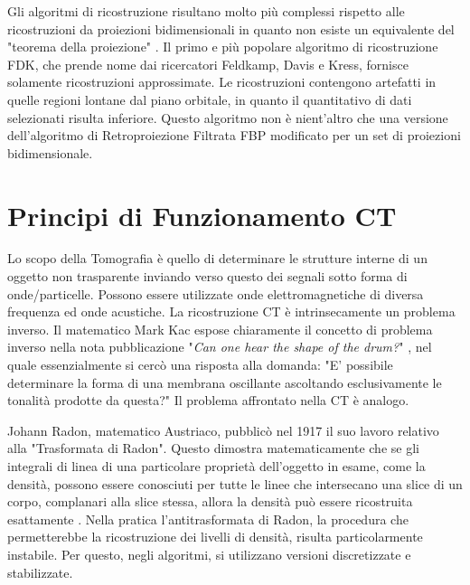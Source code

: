 \documentclass[a4paper,12pt, doubleside]{report}
\begin{document}
                \par
                    Gli algoritmi di ricostruzione risultano molto più complessi rispetto alle ricostruzioni da proiezioni bidimensionali in quanto non esiste un equivalente del "teorema della proiezione" \cite{zeng}.
                    Il primo e più popolare algoritmo di ricostruzione FDK, che prende nome dai ricercatori Feldkamp, Davis e Kress, fornisce solamente ricostruzioni approssimate. Le ricostruzioni contengono artefatti in quelle regioni lontane dal piano orbitale, in quanto il quantitativo di dati selezionati risulta inferiore.
                    Questo algoritmo non è nient'altro che una versione dell'algoritmo di Retroproiezione Filtrata FBP modificato per un set di proiezioni bidimensionale.   
                                            
        \section{Principi di Funzionamento CT}
            \par
                Lo scopo della Tomografia è quello di determinare le strutture interne di un oggetto non trasparente inviando verso questo dei segnali sotto forma di onde/particelle. Possono essere utilizzate onde elettromagnetiche di diversa frequenza ed onde acustiche. La ricostruzione CT è intrinsecamente un problema inverso.
                Il matematico Mark Kac espose chiaramente il concetto di problema inverso nella nota pubblicazione "\textit{Can one hear the shape of the drum?}" \cite{mark-kac}, nel quale essenzialmente si cercò una risposta alla domanda: "E' possibile determinare la forma di una membrana oscillante ascoltando esclusivamente le tonalità prodotte da questa?" Il problema affrontato nella CT è analogo.
            
            \bigskip
            \par
                Johann Radon, matematico Austriaco, pubblicò nel 1917 il suo lavoro relativo alla "Trasformata di Radon". Questo dimostra matematicamente che se gli integrali di linea di una particolare proprietà dell'oggetto in esame, come la densità, possono essere conosciuti per tutte le linee che intersecano una slice di un corpo, complanari alla slice stessa, allora la densità può essere ricostruita esattamente \cite{history-radiology}. Nella pratica l'antitrasformata di Radon, la procedura che permetterebbe la ricostruzione dei livelli di densità, risulta particolarmente instabile. Per questo, negli algoritmi, si utilizzano versioni discretizzate e stabilizzate.
                
\end{document}
